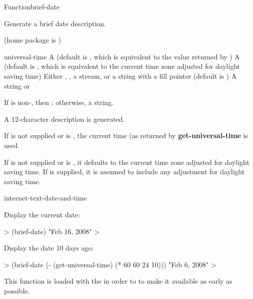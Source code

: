 \documentclass[10pt,twoside,english,pdftex]{article}
\begin{document}
\begin{functiondoc}{Function}{brief-date}{%
     
    \returns{} }
% 
% 

\fnsyntax

\fnpurpose Generate a brief date description.

\fnpackage {} (home package is )

\fnmodule {}

\fnargs
\begin{args}{universal-time}
 A  (default is \nil,
  which is equivalent to the value returned by
  )
 A  (default is \nil,
  which is equivalent to the current time zone adjusted for daylight
  saving time)
\arg[destination] Either \nil, , a stream, or a string with a fill 
pointer (default is \nil)
\arg[result] A string or \nil{}
\end{args}

\fnreturns If  is non-\nil, then \nil; otherwise, a string.

\fndescription 
A 12-character description is generated.

\W{}
%
If  is not supplied or is \nil, the current time
(as returned by \textbf{get-universal-time} is used.  

\W{}
If  is not supplied or is \nil, it defaults to the
current time zone adjusted for daylight saving time. If
 is supplied, it is assumed to include any adjustment
for daylight saving time.

\begin{alsos}{internet-text-date-and-time}
\end{alsos}

\fnexamples
Display the current date: 
%
\W\supp
\begin{example}
  > (brief-date)
  "Feb 16, 2008"
  >
\end{example}
%
Display the date 10 days ago:
%
\W\supp\notpretop
\begin{example}
  > (brief-date (- (get-universal-time) (* 60 60 24 10)))
  "Feb 6, 2008"
  >
\end{example}

\fnnote
{}%
%
%
This function is loaded with the   in order
to to make it available as early as possible.

\end{functiondoc}
\end{document}
